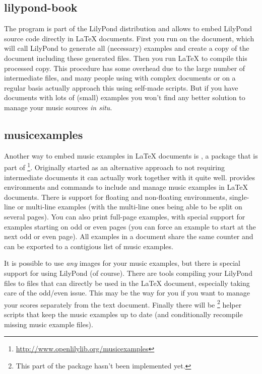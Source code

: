 \documentclass[DIV=12]{scrreprt}
\begin{document}
\subsection{lilypond-book}
\label{subsec:pt_lilypond-book}
The program  is part of the LilyPond distribution and allows to embed LilyPond source code directly in \LaTeX{} documents.
First you run  on the document, which will call LilyPond to generate all (necessary) examples and create a copy of the document including these generated files.
Then you run \LaTeX{} to compile this processed copy.
This procedure has some overhead due to the large number of intermediate files, and many people using  with complex documents or on a regular basis actually approach this using self-made scripts.
But if you have documents with lots of (small) examples you won't find any better solution to manage your music sources \emph{in situ}.

\subsection{musicexamples}
\label{subsec:pt_musicexamples}
Another way to embed music examples in \LaTeX{} documents is , a package that is part of \openlilylib%
\footnote{\url{http://www.openlilylib.org/musicexamples}}.
Originally started as an alternative approach to  not requiring intermediate documents it can actually work together with it quite well.
 provides environments and commands to include and manage music examples in \LaTeX{} documents.
There is support for floating and non-floating environments, single-line or multi-line examples (with the multi-line ones being able to be split on several pages).
You can also print full-page examples, with special support for examples starting on odd or even pages (you can force an example to start at the next odd or even page).
All examples in a document share the same counter and can be exported to a contigious list of music examples.

It is possible to use \emph{any} images for your music examples, but there is special support for using LilyPond (of course).
There are tools compiling your LilyPond files to files that can directly be used in the \LaTeX{} document, especially taking care of the odd/even issue.
This may be the way for you if you want to manage your scores separately from the text document.
Finally there will be%
\footnote{This part of the package hasn't been implemented yet.}
helper scripts that keep the music examples up to date (and conditionally recompile missing music example files).
\end{document}
